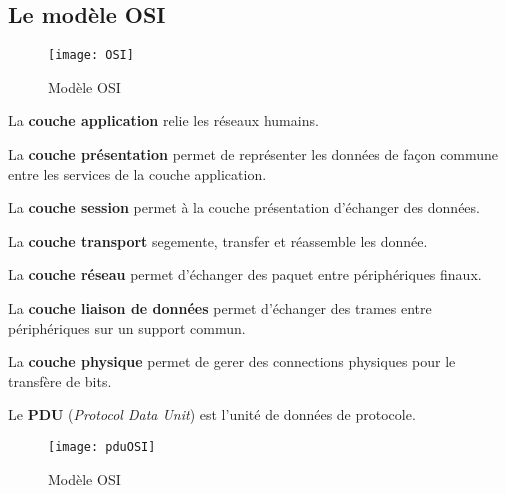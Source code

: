  \subsection{Le modèle OSI}

 \begin{figure}[h]
	 \centering
	 \texttt{[image: OSI]}
	 \caption{Modèle OSI}
 \end{figure}
 \begin{numbering}
 \item La \textbf{couche application} relie les réseaux humains.
 \item La \textbf{couche présentation} permet de représenter les données de façon commune entre les services de la couche application.
 \item La \textbf{couche session} permet à la couche présentation d'échanger des données.
 \item La \textbf{couche transport} segemente, transfer et réassemble les donnée.
 \item La \textbf{couche réseau} permet d'échanger des paquet entre périphériques finaux.
 \item La \textbf{couche liaison de données} permet d'échanger des trames entre périphériques sur un support commun.
 \item La \textbf{couche physique} permet de gerer des connections physiques pour le transfère de bits.
 \end{numbering}
 Le \textbf{PDU} (\textit{Protocol Data Unit}) est l'unité de données de protocole.
 \begin{figure}[h]
	 \centering
	 \texttt{[image: pduOSI]}
	 \caption{Modèle OSI}
 \end{figure}





